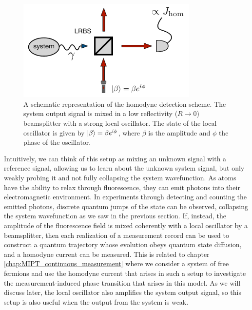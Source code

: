 \begin{figure}[ht]
    \centering
    \includegraphics[width=9cm]{Chapters/Plots/Chapter3/Chapter2_Fig3.pdf}
    \caption{A schematic representation of the homodyne detection scheme. The system output signal is mixed in a low reflectivity ($R \to 0$) beamsplitter with a strong local oscillator. The state of the local oscillator is given by $\ket{\beta} = \beta e^{i \phi}$, where $\beta$ is the amplitude and $\phi$ the phase of the oscillator.}
    \label{fig:Chapter2_Fig3}
\end{figure}

Intuitively, we can think of this setup as mixing an unknown signal with a reference signal, allowing us to learn about the unknown system signal, but only weakly probing it and not fully collapsing the system wavefunction. As atoms have the ability to relax through fluorescence, they can emit photons into their electromagnetic environment. In experiments through detecting and counting the emitted photons, discrete quantum jumps of the state can be observed, collapsing the system wavefunction as we saw in the previous section. If, instead, the amplitude of the fluorescence field is mixed coherently with a local oscillator by a beamsplitter, then each realization of a measurement record can be used to construct a quantum trajectory whose evolution obeys quantum state diffusion, and a homodyne current can be measured. This is related to chapter \ref{chap:MIPT_continuous_measurement} where we consider a system of free fermions and use the homodyne current that arises in such a setup to investigate the measurement-induced phase transition that arises in this model. As we will discuss later, the local oscillator also amplifies the system output signal, so this setup is also useful when the output from the system is weak.

